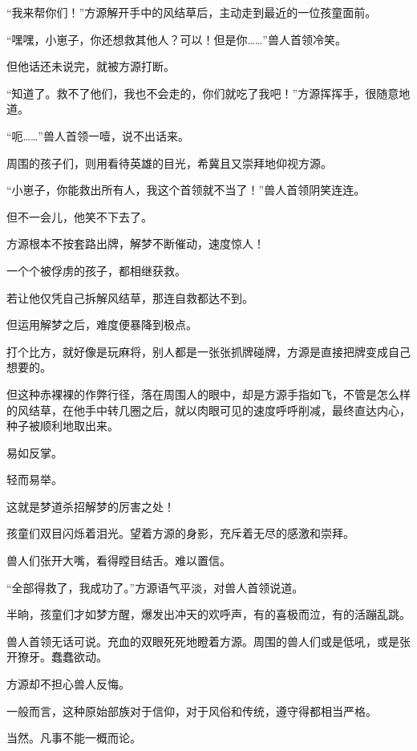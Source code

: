 
\begin{this_body}

“我来帮你们！”方源解开手中的风结草后，主动走到最近的一位孩童面前。

“嘿嘿，小崽子，你还想救其他人？可以！但是你……”兽人首领冷笑。

但他话还未说完，就被方源打断。

“知道了。救不了他们，我也不会走的，你们就吃了我吧！”方源挥挥手，很随意地道。

“呃……”兽人首领一噎，说不出话来。

周围的孩子们，则用看待英雄的目光，希冀且又崇拜地仰视方源。

“小崽子，你能救出所有人，我这个首领就不当了！”兽人首领阴笑连连。

但不一会儿，他笑不下去了。

方源根本不按套路出牌，解梦不断催动，速度惊人！

一个个被俘虏的孩子，都相继获救。

若让他仅凭自己拆解风结草，那连自救都达不到。

但运用解梦之后，难度便暴降到极点。

打个比方，就好像是玩麻将，别人都是一张张抓牌碰牌，方源是直接把牌变成自己想要的。

但这种赤裸裸的作弊行径，落在周围人的眼中，却是方源手指如飞，不管是怎么样的风结草，在他手中转几圈之后，就以肉眼可见的速度呼呼削减，最终直达内心，种子被顺利地取出来。

易如反掌。

轻而易举。

这就是梦道杀招解梦的厉害之处！

孩童们双目闪烁着泪光。望着方源的身影，充斥着无尽的感激和崇拜。

兽人们张开大嘴，看得瞠目结舌。难以置信。

“全部得救了，我成功了。”方源语气平淡，对兽人首领说道。

半晌，孩童们才如梦方醒，爆发出冲天的欢呼声，有的喜极而泣，有的活蹦乱跳。

兽人首领无话可说。充血的双眼死死地瞪着方源。周围的兽人们或是低吼，或是张开獠牙。蠢蠢欲动。

方源却不担心兽人反悔。

一般而言，这种原始部族对于信仰，对于风俗和传统，遵守得都相当严格。

当然。凡事不能一概而论。


\end{this_body}

